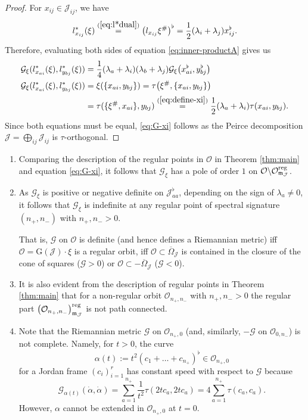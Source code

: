 \documentclass[10pt,a4paper]{amsart}
\numberwithin{equation}{section}
\newcommand{\ocal}{\mathcal{O}}
\newcommand{\Jcal}{\mathcal{J}}
\newcommand{\m}{\mathfrak{m}}
\newcommand{\G}{\mathrm{G}}
\renewcommand{\m}{{\mathfrak m}}
\newcommand{\Gcal}{\mathcal{G}}
\begin{document}
\begin{proof}
For $x_{ij} \in \Jcal_{ij}$, we have
\[
l_{x_{ij}}^\ast(\xi) \stackrel{(\ref{eq:l*dual})}= \big(l_{x_{ij}}\xi^\#\big)^\flat = \frac12 (\lambda_i + \lambda_j) x_{ij}^\flat.
\]
Therefore, evaluating both sides of equation \eqref{eq:inner-productA} gives us
\begin{align*}
\Gcal_\xi(l_{x_{ai}}^\ast(\xi), l_{y_{bj}}^\ast(\xi)) & = \frac14 (\lambda_a + \lambda_i)(\lambda_b + \lambda_j) \Gcal_\xi\big(x_{ai}^\flat, y_{bj}^\flat\big)\\
\Gcal_\xi(l_{x_{ai}}^\ast(\xi), l_{y_{bj}}^\ast(\xi)) & = \xi(\{x_{ai}, y_{bj}\}) = \tau\big(\xi^\#, \{x_{ai}, y_{bj}\}\big)\\
& = \tau(\{\xi^\#, x_{ai}\}, y_{bj}) \stackrel{(\ref{eq:define-xi})} = \frac12 (\lambda_a + \lambda_i) \tau(x_{ai}, y_{bj}).
\end{align*}
Since both equations must be equal, \eqref{eq:G-xi} follows as the Peirce decomposition ${\Jcal =  \bigoplus_{ij} \Jcal_{ij}}$ is $\tau$-orthogonal.
\end{proof}

\begin{Remark}\quad
\begin{enumerate}\itemsep=0pt
\item[(1)]
Comparing the description of the regular points in $\ocal$ in Theorem \ref{thm:main} and equation \eqref{eq:G-xi}, it follows that $\Gcal_\xi$ has a pole of order $1$ on $\ocal \backslash \ocal^{\rm reg}_{\m_{\Jcal}}$.

\item[(2)]
As $\Gcal_\xi$ is positive or negative definite on $\Jcal_{aa}^\flat$, depending on the sign of $\lambda_a \neq 0$, it follows that $\Gcal_\xi$ is indefinite at any regular point of spectral signature $(n_+, n_-)$ with $n_+, n_- > 0$.

That is, $\Gcal$ on $\ocal$ is definite (and hence defines a Riemannian metric) iff $\ocal = \G(\Jcal) \cdot \xi$ is a regular orbit, iff $\ocal \subset \overline{\Omega}_\Jcal$ is contained in the closure of the cone of squares ($\Gcal > 0$) or $\ocal \subset -\overline{\Omega}_\Jcal$ ($\Gcal < 0$).

\item[(3)]
It is also evident from the description of regular points in Theorem \ref{thm:main} that for a non-regular orbit $\ocal_{n_+,n_-}$ with $n_+,n_- > 0$ the regular part $\left(\ocal_{n_+,n_-}\right)^{\rm reg}_{\m_{\Jcal}}$ is not path connected.

\item[(4)]
Note that the Riemannian metric $\Gcal$ on $\ocal_{n_+,0}$ (and, similarly, $-\Gcal$ on $\ocal_{0,n_-}$) is not complete.
Namely, for $t>0$, the curve
\[
\alpha(t) := t^2 (c_1 + \dots + c_{n_+})^\flat \in \ocal_{n_+,0}
\]
for a Jordan frame $(c_i)_{i=1}^r$ has constant speed with respect to $\Gcal$ because
\[
\Gcal_{\alpha(t)}(\dot \alpha, \dot \alpha) = \sum_{a=1}^{n_+} \frac1{t^2} \tau(2t c_a, 2t c_a) = 4 \sum_{a=1}^{n_+} \tau(c_a, c_a).
\]
However, $\alpha$ cannot be extended in $\ocal_{n_+,0}$ at $t = 0$.
\end{enumerate}
\end{Remark}
\end{document}
